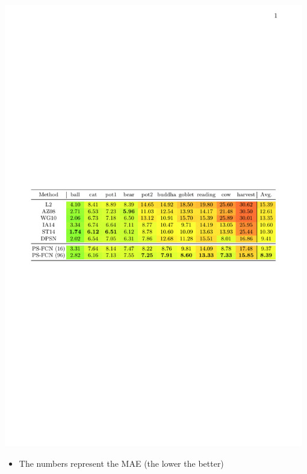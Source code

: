 \documentclass[portrait,a0paper,fontscale=0.292]{baposter}
\begin{document}
\begin{poster}
{\begin{minipage}[t]{0.4\textwidth}
\begin{center}
            \includegraphics[width=0.98\textwidth]{images/res_quant_diligent_main_v2}
        \end{center}
        \vspace{-0.5em}
        \begin{itemize}
            \item The numbers represent the MAE (the lower the better)
        \end{itemize}
    \end{minipage}


}
\end{poster}
\end{document}
